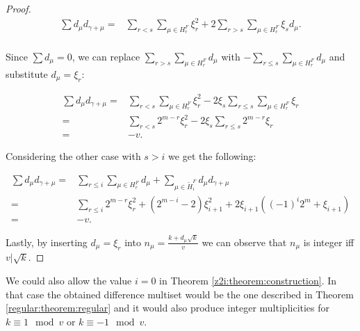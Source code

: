 \begin{proof}
    \begin{equation}
        \begin{split}
            \sum d_\mu d_{\gamma+\mu}
              = & \sum\limits_{r<s} \sum\limits_{\mu \in H_r^F} \xi_r^2
                + 2\sum\limits_{r>s} \sum\limits_{\mu \in H_r^F} \xi_s d_\mu. \\
        \end{split}
    \end{equation}
    
    Since $\sum d_{\mu} = 0$, we can replace $\sum_{r>s} \sum_{\mu \in H_r^F} d_\mu$ with $-\sum_{r\leq s} \sum_{\mu \in H_r^F} d_\mu$ and substitute $d_\mu=\xi_r$:
    
    \begin{equation}
        \begin{split}
            \sum d_\mu d_{\gamma+\mu}
              = & \sum\limits_{r<s} \sum\limits_{\mu \in H_r^F} \xi_r^2
                - 2 \xi_s \sum\limits_{r \leq s} \sum\limits_{\mu \in H_r^F} \xi_r \\
              = & \sum\limits_{r<s} 2^{m-r} \xi_r^2
                - 2 \xi_s \sum\limits_{r \leq s}  2^{m-r} \xi_r \\
              = & - v.
        \end{split}
    \end{equation}
    
    Considering the other case with $s > i$ we get the following:
    
    \begin{equation}
        \begin{split}
            \sum d_\mu d_{\gamma+\mu}
              = & \sum\limits_{r \leq i} \sum\limits_{\mu \in H_r^F} d_\mu
                + \sum\limits_{\mu \in \widetilde H_i^F} d_\mu d_{\gamma + \mu} \\
              = & \sum\limits_{r\leq i} 2^{m-r} \xi_r^2
                + (2^{m-i}-2) \xi_{i+1}^2 + 2\xi_{i+1}((-1)^i 2^m + \xi_{i+1}) \\
              = & -v.
        \end{split}
    \end{equation}
    
    Lastly, by inserting $d_\mu = \xi_r$ into $n_\mu=\frac{k+d_\mu \sqrt k}v$ we can observe that $n_\mu$ is integer iff $v | \sqrt k$.
\end{proof}

\begin{remark}
    We could also allow the value $i=0$ in Theorem \ref{z2i:theorem:construction}. In that case the obtained difference multiset would be the one described in 
Theorem \ref{regular:theorem:regular} and it would also produce  integer multiplicities for $k \equiv 1 \mod v$ or $k \equiv -1 \mod v$.
\end{remark}

